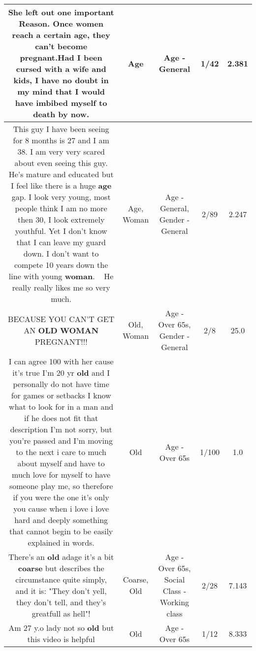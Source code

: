 \documentclass[11pt]{article}
\newlength\mylength
\begin{document}
\begin{center}
\begin{longtable}{|C{.65\mylength}|C{.30\mylength}|C{.12\mylength}|C{.12\mylength}|C{.12\mylength}|}
  \small She left out one important Reason. Once women reach a certain \textbf{age}, they can't become pregnant.Had I been cursed with a wife and kids, I have no doubt in my mind that I would have imbibed myself to death by now.\normalsize   & Age & Age - General & 1/42 & 2.381 \\  \hline
  \small This guy I have been seeing for 8 months is 27 and I am 38. I am very very scared about even seeing this guy. He's mature and educated but I feel like there is a huge \textbf{age} gap. I look very young, most people think I am no more then 30, I look extremely youthful. Yet I don't know that I can leave my guard down. I don't want to compete 10 years down the line with young \textbf{woman}. 🤷🏻‍♀️He really really likes me so very much.\normalsize   & Age, Woman & Age - General, Gender - General & 2/89 & 2.247 \\  \hline
  \small BECAUSE YOU CAN'T GET AN \textbf{OLD} \textbf{WOMAN} PREGNANT!!!\normalsize   & Old, Woman & Age - Over 65s, Gender - General & 2/8 & 25.0 \\  \hline
  \small I can agree 100 with her cause it's true I'm 20 yr \textbf{old} and I personally do not have time for games or setbacks I know what to look for in a man and if he does not fit that description I'm not sorry, but you're passed and I'm moving to the next i care to much about myself and have to much love for myself to have someone play me, so therefore if you were the one it's only you cause when i love i love hard and deeply something that cannot begin to be easily explained in words.\normalsize   & Old & Age - Over 65s & 1/100 & 1.0 \\  \hline
  \small There's an \textbf{old} adage it's a bit \textbf{coarse} but describes the circumstance quite simply, and it is: "They don't yell, they don't tell, and they's greatfull as hell"!\normalsize   & Coarse, Old & Age - Over 65s, Social Class - Working class & 2/28 & 7.143 \\  \hline
  \small Am 27 y.o lady not so \textbf{old} but this video is helpful\normalsize   & Old & Age - Over 65s & 1/12 & 8.333 \\  \hline

\end{longtable}
\end{center}
\end{document}
